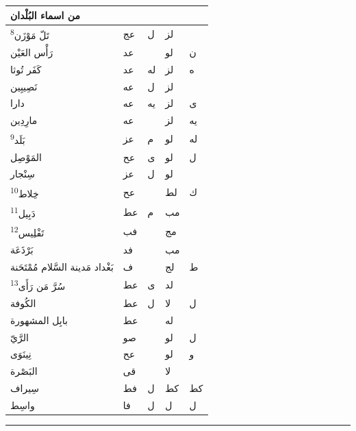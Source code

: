 \documentclass[11pt]{article}
\newcommand{\AbjadZero}{{\NallinoSigns\symbol{"E000}}}
\begin{document}
\begin{Arabic}
\begin{minipage}[t]{0.495\textwidth}
\begin{tabular}{|p{55mm}|>{\centering\arraybackslash}p{4.8mm}>{\centering\arraybackslash}p{4.8mm}|>{\centering\arraybackslash}p{4.8mm}>{\centering\arraybackslash}p{4.8mm}|}
\centering من اسماء البُلْدان & \multicolumn{2}{c|}{الطول} & \multicolumn{2}{c|}{العرض} \\ \hline
{}تَلّ مَوْزَن\textsuperscript{8} & عج & ل & لز & \AbjadZero{} \\
{}رَأْس العَيْن & عد & \AbjadZero{} & لو & ن \\
{}كَفَر تُوثا & عد & له & لز & ه \\
{}نَصِيبِين & عه & ل & لز & \AbjadZero{} \\
{}دارا & عه & يه & لز & ى \\
{}مارِدِين & عه & \AbjadZero{} & لز & يه \\
{}بَلَد\textsuperscript{9} & عز & م & لو & له \\
{}المَوْصِل & عح & ى & لو & ل \\
{}سِنْجار & عز & ل & لو & \AbjadZero{} \\
{}خِلاط\textsuperscript{10} & عح & \AbjadZero{} & لط & ك \\
{}دَبِيل\textsuperscript{11} & عط & م & مب & \AbjadZero{} \\
{}تَفْلِيس\textsuperscript{12} & فب & \AbjadZero{} & مج & \AbjadZero{} \\
{}بَرْذَعَة & فد & \AbjadZero{} & مب & \AbjadZero{} \\
{}بَغْداد مَدينة السَّلام مُمْتَحَنة & ف & \AbjadZero{} & لج & ط \\
{}سُرَّ مَن رَأَى\textsuperscript{13} & عط & ى & لد & \AbjadZero{} \\
{}الكُوفة & عط & ل & لا & ل \\
{}بابِل المشهورة & عط & \AbjadZero{} & له & \AbjadZero{} \\
{}الرَّيّ & صو & \AbjadZero{} & لو & ل \\
{}نِينَوَى & عح & \AbjadZero{} & لو & و \\
{}البَصْرة & قى & \AbjadZero{} & لا & \AbjadZero{} \\
{}سِيراف & فط & ل & كط & كط \\
{}واسِط & فا & ل & ل & ل \\
\hline\end{tabular}\end{minipage}
\end{Arabic}
\par\vspace{3mm}\noindent\rule{40mm}{.4pt}\par{}
\end{document}
